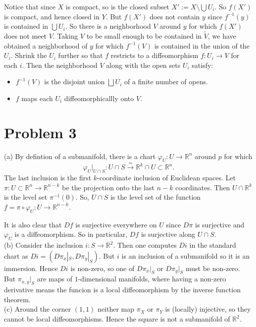 \documentclass{amsart}
\numberwithin{equation}{section}
\theoremstyle{plain}
\theoremstyle{definition}
\theoremstyle{remark}
\renewcommand{\_}[2]{\underbrace{#1}_{#2}}
\renewcommand{\^}[2]{\overbrace{#1}_{#2}}
\newcommand{\R}{\mathbb{R}}
\begin{document}
Notice that since $X$ is compact, so is the closed subset $X':= X \setminus \bigcup U_i$. So $f(X')$ is compact, and hence closed in $Y$. But $f(X')$ does not contain $y$ since $f^{-1}(y)$ is contained in $\bigcup U_i$. So there is a neighborhood $V$ around $y$ for which $f(X')$ does not meet $V$. Taking $V$ to be small enough to be contained in $\tilde V$, we have obtained a neighborhood of $y$ for which $f^{-1}(V)$ is contained in the union of the $U_i$. Shrink the $U_i$ further so that $f$ restricts to a diffeomorphism $f:U_i \to V$ for each $i$. Then the neighborhood $V$ along with the open sets $U_i$ satisfy:

\begin{itemize}
\item $f^{-1}(V)$ is the disjoint union $\bigsqcup U_i$ of a finite number of opens.
\item $f$ maps each $U_i$ diffeomorphicallly onto $V$. 
\end{itemize}

\section*{Problem 3}
(a) By defintion of a submanifold, there is a chart $\varphi_U:U \to \R^n$ around $p$ for which $$\varphi_U|_{U\cap S}: U\cap S \stackrel{\simeq}{\to} \R^k \cap U \subset \R^n.$$ The last inclusion is the first $k$-coordinate inclusion of Euclidean spaces. Let $\pi: U\subset \R^n \to \R^{n-k}$ be the projection onto the last $n-k$ coordinates. Then $U\cap \R^k$ is the level set $\pi^{-1}(0)$. So, $U\cap S$ is the level set of the function $f = \pi \circ \varphi_U: U \to \R^{n-k}$.

It is also clear that $Df$ is surjective everywhere on $U$ since $D\pi$ is surjective and $\varphi_U$ is a diffeomorphism. So in particular, $Df$ is surjective along $U\cap S$. \\

(b) Consider the inclusion $i:S\to \R^2$. Then one computes $Di$ in the standard chart as $Di = (D\pi_x|_S, D\pi_y|_S)$. But $i$ is an inclusion of a submanifold so it is an immersion. Hence $Di$ is non-zero, so one of $D\pi_x|_S$ or $D\pi_y|_S$ must be non-zero. But $\pi_{x,y}|_S$ are maps of $1$-dimensional manifolds, where having a non-zero derivative means the funcion is a local diffeomorphism by the inverse function theorem. \\

(c) Around the corner $(1,1)$ neither map $\pi_X$ or $\pi_Y$ is (locally) injective, so they cannot be local diffeomorphisms. Hence the square is not a submanifold of $\R^2$. 
\end{document}
